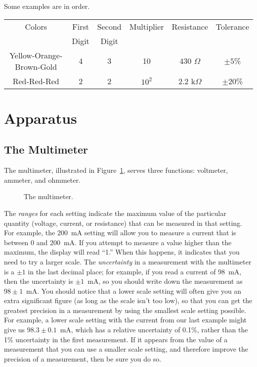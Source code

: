 Some examples are in order.\\
\begin{tabular}{cccccc}
Colors & First & Second & Multiplier & Resistance & Tolerance \\
& Digit & Digit & & & \\
Yellow-Orange-Brown-Gold & 4 & 3 & 10 & 430  $\Omega$ & $\pm 5$\%  \\
Red-Red-Red   & 2 & 2 & $10^2$ & 2.2 k$\Omega$ & $\pm 20$\% 
\end{tabular}

\section{Apparatus}

\subsection{The Multimeter}

The multimeter, illustrated in Figure~\ref{fig:DC:multimeter}, serves three 
functions: voltmeter, ammeter, and ohmmeter. 
\begin{figure}[htb]
\centerline{\epsfxsize=6cm } 
\caption{The multimeter.}
\label{fig:DC:multimeter}
\end{figure}
The {\it ranges} for each setting indicate the maximum value of the particular
quantity (voltage, current, or resistance) that can be measured in that 
setting.  For example, the 200~mA setting will allow you to measure a current
that is between 0 and 200~mA. If you attempt to measure a value higher than the
maximum, the display will read ``1.''  When this happens, it indicates that you
need to try a larger scale.  The {\it uncertainty} in a measurement with
the multimeter is a $\pm 1$ in the last decimal place; for example, if you read
a current of 98~mA, then the uncertainty is $\pm 1$~mA, so you should write
down the measurement as $98\pm 1$~mA.  You should notice that a lower scale
setting will often give you an extra significant figure (as long as the scale 
isn't too low), so that you can get the greatest precision in a measurement by 
using the smallest scale setting possible.  For example, a lower scale setting
with the current from our last example might give us $98.3\pm 0.1$~mA, which 
has a relative uncertainty of 0.1\%, rather than the 1\% uncertainty in the 
first measurement. If it appears from the value of a measurement that you can 
use a smaller scale setting, and therefore improve the precision of a 
measurement, then be sure you do so.

